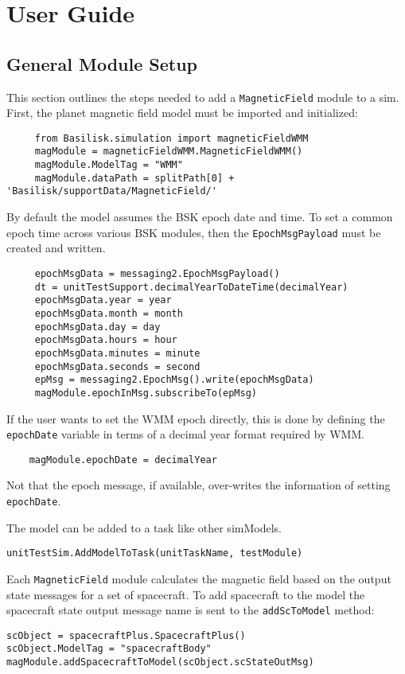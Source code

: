 
\section{User Guide}

\subsection{General Module Setup}
This section outlines the steps needed to add a {\tt MagneticField} module to a sim.
First, the planet magnetic field model must be imported and initialized:
\begin{verbatim}
     from Basilisk.simulation import magneticFieldWMM
     magModule = magneticFieldWMM.MagneticFieldWMM()
     magModule.ModelTag = "WMM"
     magModule.dataPath = splitPath[0] + 'Basilisk/supportData/MagneticField/'
\end{verbatim}
By default the model assumes the BSK epoch date and time.  To set a common epoch time across various BSK modules, then the {\tt EpochMsgPayload} must be created and written.
\begin{verbatim}
     epochMsgData = messaging2.EpochMsgPayload()
     dt = unitTestSupport.decimalYearToDateTime(decimalYear)
     epochMsgData.year = year
     epochMsgData.month = month
     epochMsgData.day = day
     epochMsgData.hours = hour
     epochMsgData.minutes = minute
     epochMsgData.seconds = second
     epMsg = messaging2.EpochMsg().write(epochMsgData)
     magModule.epochInMsg.subscribeTo(epMsg)
\end{verbatim}
If the user wants to set the WMM epoch directly, this is done by defining the {\tt epochDate} variable in terms of a decimal year format required by WMM. 
\begin{verbatim}
	magModule.epochDate = decimalYear
\end{verbatim}
Not that the epoch message, if available, over-writes the information of setting {\tt epochDate}.  

The model can  be added to a task like other simModels. 
\begin{verbatim}
unitTestSim.AddModelToTask(unitTaskName, testModule)
\end{verbatim}

Each {\tt MagneticField} module calculates the magnetic field based on the output state messages for a set of spacecraft.
To add spacecraft to the model the spacecraft state output message name is sent to the \verb|addScToModel| method:
\begin{verbatim}
scObject = spacecraftPlus.SpacecraftPlus()
scObject.ModelTag = "spacecraftBody"
magModule.addSpacecraftToModel(scObject.scStateOutMsg)
\end{verbatim}

